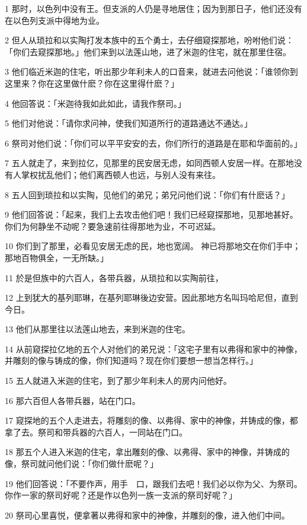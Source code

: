 \par 1 那时，以色列中没有王。但支派的人仍是寻地居住；因为到那日子，他们还没有在以色列支派中得地为业。
\par 2 但人从琐拉和以实陶打发本族中的五个勇士，去仔细窥探那地，吩咐他们说：「你们去窥探那地。」他们来到以法莲山地，进了米迦的住宅，就在那里住宿。
\par 3 他们临近米迦的住宅，听出那少年利未人的口音来，就进去问他说：「谁领你到这里来？你在这里做什麽？你在这里得什麽？」
\par 4 他回答说：「米迦待我如此如此，请我作祭司。」
\par 5 他们对他说：「请你求问神，使我们知道所行的道路通达不通达。」
\par 6 祭司对他们说：「你们可以平平安安的去，你们所行的道路是在耶和华面前的。」
\par 7 五人就走了，来到拉亿，见那里的民安居无虑，如同西顿人安居一样。在那地没有人掌权扰乱他们；他们离西顿人也远，与别人没有来往。
\par 8 五人回到琐拉和以实陶，见他们的弟兄；弟兄问他们说：「你们有什麽话？」
\par 9 他们回答说：「起来，我们上去攻击他们吧！我们已经窥探那地，见那地甚好。你们为何静坐不动呢？要急速前往得那地为业，不可迟延。
\par 10 你们到了那里，必看见安居无虑的民，地也宽阔。 神已将那地交在你们手中；那地百物俱全，一无所缺。」
\par 11 於是但族中的六百人，各带兵器，从琐拉和以实陶前往，
\par 12 上到犹大的基列耶琳，在基列耶琳後边安营。因此那地方名叫玛哈尼但，直到今日。
\par 13 他们从那里往以法莲山地去，来到米迦的住宅。
\par 14 从前窥探拉亿地的五个人对他们的弟兄说：「这宅子里有以弗得和家中的神像，并雕刻的像与铸成的像，你们知道吗？现在你们要想一想当怎样行。」
\par 15 五人就进入米迦的住宅，到了那少年利未人的房内问他好。
\par 16 那六百但人各带兵器，站在门口。
\par 17 窥探地的五个人走进去，将雕刻的像、以弗得、家中的神像，并铸成的像，都拿了去。祭司和带兵器的六百人，一同站在门口。
\par 18 那五个人进入米迦的住宅，拿出雕刻的像、以弗得、家中的神像，并铸成的像，祭司就问他们说：「你们做什麽呢？」
\par 19 他们回答说：「不要作声，用手　口，跟我们去吧！我们必以你为父、为祭司。你作一家的祭司好呢？还是作以色列一族一支派的祭司好呢？」
\par 20 祭司心里喜悦，便拿著以弗得和家中的神像，并雕刻的像，进入他们中间。
